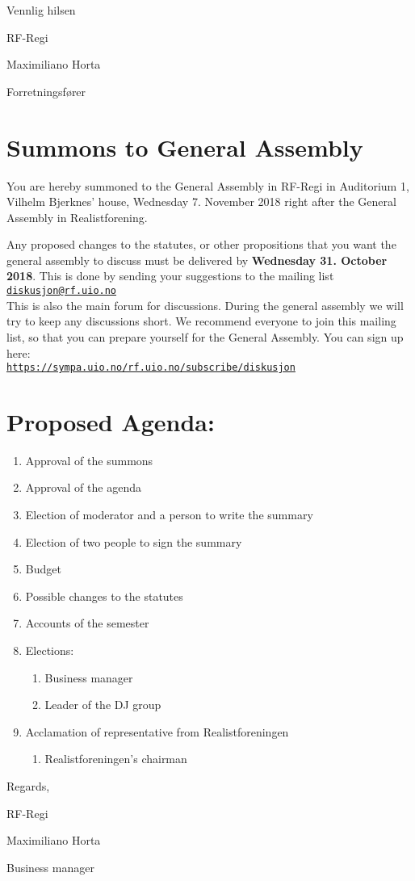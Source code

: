 \documentclass[a4paper]{article}
\begin{document}
\vspace{2.5cm}

Vennlig hilsen

RF-Regi

Maximiliano Horta

Forretningsfører

\newpage

\section*{\textsf{\textbf{\huge Summons to General Assembly}}}
\vspace{1cm}

You are hereby summoned to the General Assembly in RF-Regi in Auditorium 1,
Vilhelm Bjerknes' house, Wednesday 7. November 2018 right after
the General Assembly in Realistforening.


Any proposed changes to the statutes, or other propositions that you want the general
assembly to discuss must be delivered by \textbf{Wednesday 31. October 2018}.
This is done by sending your suggestions to the mailing list
\href{mailto:diskusjon@rf.uio.no}{\texttt{diskusjon@rf.uio.no}} \\


This is also the main forum for discussions. During the general assembly we will try to keep
any discussions short. We recommend everyone to join this mailing list, so that you can
prepare yourself for the General Assembly. You can sign up here: \\
\texttt{\url{https://sympa.uio.no/rf.uio.no/subscribe/diskusjon}}\\

\section*{\textsf{Proposed Agenda:}}
\begin{enumerate}
    \item Approval of the summons
    \item Approval of the agenda
    \item Election of moderator and a person to write the summary
    \item Election of two people to sign the summary
    \item Budget
    \item Possible changes to the statutes
    \item Accounts of the semester
    \item Elections:
    \begin{enumerate}
        \item Business manager
        \item Leader of the DJ group
    \end{enumerate}
    \item Acclamation of representative from Realistforeningen
    \begin{enumerate}
        \item Realistforeningen's chairman
    \end{enumerate}
\end{enumerate}

\vspace{2cm}
Regards,

RF-Regi

Maximiliano Horta

Business manager
\end{document}
